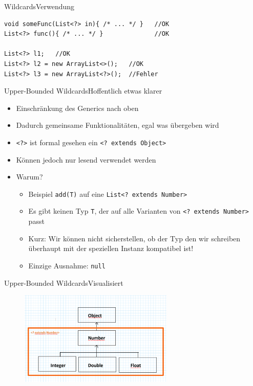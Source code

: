 \begin{frame}[fragile]{Wildcards}{Verwendung}
\lstset{style=java}
\begin{lstlisting}
void someFunc(List<?> in){ /* ... */ }   //OK
List<?> func(){ /* ... */ }              //OK

List<?> l1;   //OK
List<?> l2 = new ArrayList<>();   //OK
List<?> l3 = new ArrayList<?>();  //Fehler
\end{lstlisting}
\end{frame}

\begin{frame}{Upper-Bounded Wildcards}{Hoffentlich etwas klarer}
    \begin{itemize}[<+->]
        \item Einschränkung des Generics nach oben
        \item Dadurch gemeinsame Funktionalitäten, egal was übergeben wird
        \item \texttt{<?>} ist formal gesehen ein \texttt{<? extends Object>}
        \item Können jedoch nur lesend verwendet werden
        \item Warum?
        \begin{itemize}[<+-|handout:0>]
            \item Beispiel \texttt{add(T)} auf eine \texttt{List<? extends Number>}
            \item Es gibt keinen Typ \texttt{T}, der auf alle Varianten von \texttt{<? extends Number>} passt
            \item Kurz: Wir können nicht sicherstellen, ob der Typ den wir schreiben überhaupt mit der speziellen Instanz kompatibel ist!
            \item Einzige Ausnahme: \texttt{null}
        \end{itemize}
    \end{itemize}
\end{frame}

\begin{frame}{Upper-Bounded Wildcards}{Visualisiert}
    \begin{figure}
        \centering
        \includegraphics[height=4.5cm]{graph/wildcard_upper}
    \end{figure}
\end{frame}

